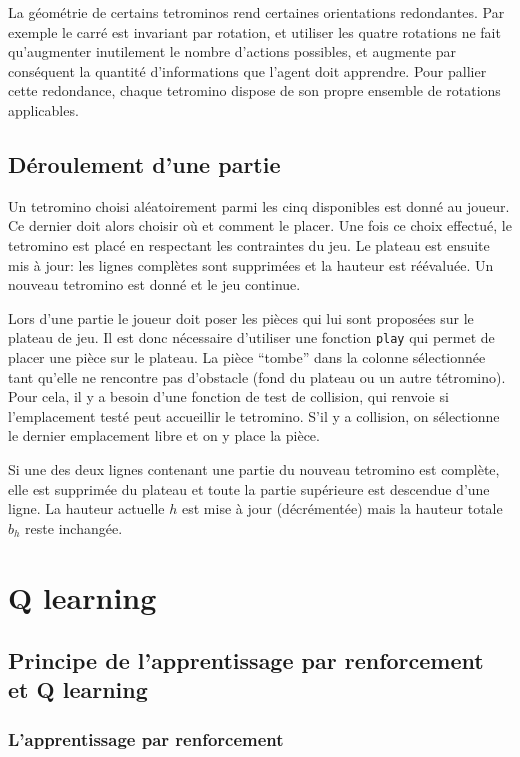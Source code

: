 \documentclass{report}
\begin{document}
La géométrie de certains tetrominos rend certaines orientations redondantes. Par
exemple le carré est invariant par rotation, et utiliser les quatre rotations
ne fait qu'augmenter inutilement le nombre d'actions possibles, et augmente par
conséquent la quantité d'informations que l'agent doit apprendre. Pour pallier
cette redondance, chaque tetromino dispose de son propre ensemble de rotations
applicables.

\section{Déroulement d'une partie}
Un tetromino choisi aléatoirement parmi les cinq disponibles est donné au
joueur. Ce dernier doit alors choisir où et comment le placer. Une fois ce
choix effectué, le tetromino est placé en respectant les contraintes du jeu. Le
plateau est ensuite mis à jour: les lignes complètes sont supprimées et la
hauteur est réévaluée. Un nouveau tetromino est donné et le jeu continue.


Lors d'une partie le joueur doit poser les pièces qui lui sont proposées sur
le plateau de jeu. Il est donc nécessaire d'utiliser une fonction \texttt{play}
qui permet de placer une pièce sur le plateau. La pièce ``tombe'' dans la
colonne sélectionnée tant qu'elle ne rencontre pas d'obstacle (fond du plateau
ou un autre tétromino). Pour cela, il y a besoin d'une fonction de test de
collision, qui renvoie si l'emplacement testé peut accueillir le tetromino.
S'il y a collision, on sélectionne le dernier emplacement libre et on y place la
pièce.

Si une des deux lignes contenant une partie du nouveau tetromino est complète,
elle est supprimée du plateau et toute la partie supérieure est
descendue d'une ligne. La hauteur actuelle \(h\) est mise \`a jour (décrémentée)
mais la hauteur totale \(b_h\) reste inchangée.


\chapter{Q learning}

\section{Principe de l'apprentissage par renforcement et Q learning}
\subsection{L'apprentissage par renforcement}
\end{document}
